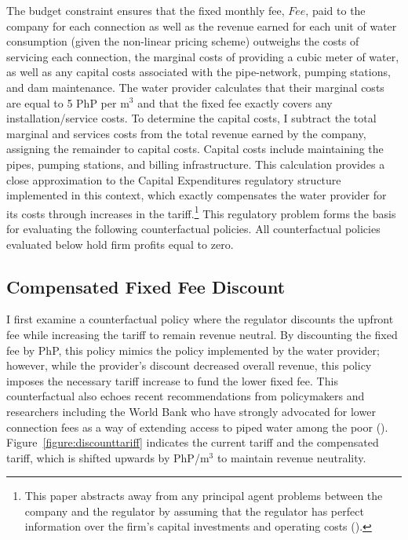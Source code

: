 \documentclass[12pt]{article}
\begin{document}
The budget constraint ensures that the fixed monthly fee, $Fee$, paid to the company for each connection as well as the revenue earned for each unit of water consumption (given the non-linear pricing scheme) outweighs the costs of servicing each connection, the marginal costs of providing a cubic meter of water, as well as any capital costs associated with the pipe-network, pumping stations, and dam maintenance.  The water provider calculates that their marginal costs are equal to 5 PhP per $\text{m}^{3}$ and that the fixed fee exactly covers any installation/service costs.  To determine the capital costs, I subtract the total marginal and services costs from the total revenue earned by the company, assigning the remainder to capital costs.  Capital costs include maintaining the pipes, pumping stations, and billing infrastructure.  This calculation provides a close approximation to the Capital Expenditures regulatory structure implemented in this context, which exactly compensates the water provider for its costs through increases in the tariff.\footnote{This paper abstracts away from any principal agent problems between the company and the regulator by assuming that the regulator has perfect information over the firm's capital investments and operating costs (\cite{laffont1993theory}).}  This regulatory problem forms the basis for evaluating the following counterfactual policies.  All counterfactual policies evaluated below hold firm profits equal to zero.


\subsection{Compensated Fixed Fee Discount}

I first examine a counterfactual policy where the regulator discounts the upfront fee while increasing the tariff to remain revenue neutral.  By discounting the fixed fee by PhP, this policy mimics the policy implemented by the water provider; however, while the provider's discount decreased overall revenue, this policy imposes the necessary tariff increase to fund the lower fixed fee.  This counterfactual also echoes recent recommendations from policymakers and researchers including the World Bank who have strongly advocated for lower connection fees as a way of extending access to piped water among the poor (\cite{wsup,komives2005water,jimenez2014factors,kayaga2007costs,mcintosh2003asian}).  Figure~\ref{figure:discounttariff} indicates the current tariff and the compensated tariff, which is shifted upwards by PhP/$\text{m}^{3}$ to maintain revenue neutrality.  
\end{document}
